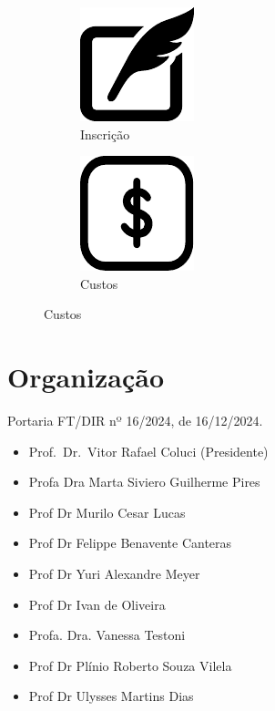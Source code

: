 \documentclass[
  letterpaper,
  DIV=11,
  numbers=noendperiod,
  oneside]{scrreprt}
\begin{document}
\begin{figure}
\begin{figure}[H]
{\centering \includegraphics{index_files/mediabag/inscricao/inscricao.pdf}

}

\caption{Inscrição}

\end{figure}%

\begin{figure}[H]

{\centering \includegraphics{index_files/mediabag/custos/custos.pdf}

}

\caption{Custos}

\end{figure}%

\end{figure}%


\chapter{Organização}\label{organizauxe7uxe3o}

Portaria FT/DIR nº 16/2024, de 16/12/2024.

\begin{itemize}
\item
  Prof.~Dr.~Vitor Rafael Coluci (Presidente)
\item
  Profa Dra Marta Siviero Guilherme Pires
\item
  Prof Dr Murilo Cesar Lucas
\item
  Prof Dr Felippe Benavente Canteras
\item
  Prof Dr Yuri Alexandre Meyer
\item
  Prof Dr Ivan de Oliveira
\item
  Profa. Dra. Vanessa Testoni
\item
  Prof Dr Plínio Roberto Souza Vilela
\item
  Prof Dr Ulysses Martins Dias
\end{itemize}
\end{document}
